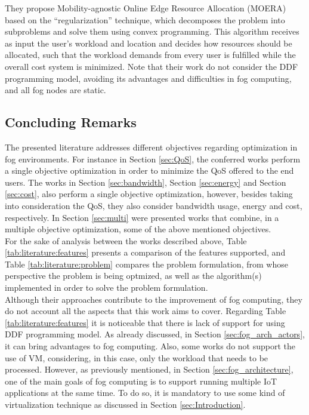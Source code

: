 They propose Mobility-agnostic Online Edge Resource Allocation (MOERA) based on the ``regularization'' technique, which decomposes the problem into subproblems and solve them using convex programming. This algorithm receives as input the user’s workload and location and decides how resources should be allocated, such that the workload demands from every user is fulfilled while the overall cost system is minimized. Note that their work do not consider the DDF programming model, avoiding its advantages and difficulties in fog computing, and all fog nodes are static.

\subsection{Concluding Remarks}
The presented literature addresses different objectives regarding optimization in fog environments. For instance in Section \ref{sec:QoS}, the conferred works perform a single objective optimization in order to minimize the QoS offered to the end users. The works in Section \ref{sec:bandwidth}, Section \ref{sec:energy} and Section \ref{sec:cost}, also perform a single objective optimization, however, besides taking into consideration the QoS, they also consider bandwidth usage, energy and cost, respectively. In Section \ref{sec:multi} were presented works that combine, in a multiple objective optimization, some of the above mentioned objectives.\\
\noindent\tab For the sake of analysis between the works described above, Table \ref{tab:literature:features} presents a comparison of the features supported, and Table \ref{tab:literature:problem} compares the problem formulation, from whose perspective the problem is being optmized, as well as the algorithm(s) implemented in order to solve the problem formulation.\\
\noindent\tab Although their approaches contribute to the improvement of fog computing, they do not account all the aspects that this work aims to cover. Regarding Table \ref{tab:literature:features} it is noticeable that there is lack of support for using DDF programming model. As already discussed, in Section \ref{sec:fog_arch_actors}, it can bring advantages to fog computing. Also, some works do not support the use of VM, considering, in this case, only the workload that needs to be processed. However, as previously mentioned, in Section \ref{sec:fog_architecture}, one of the main goals of fog computing is to support running multiple IoT applications at the same time. To do so, it is mandatory to use some kind of virtualization technique as discussed in Section \ref{sec:Introduction}.
